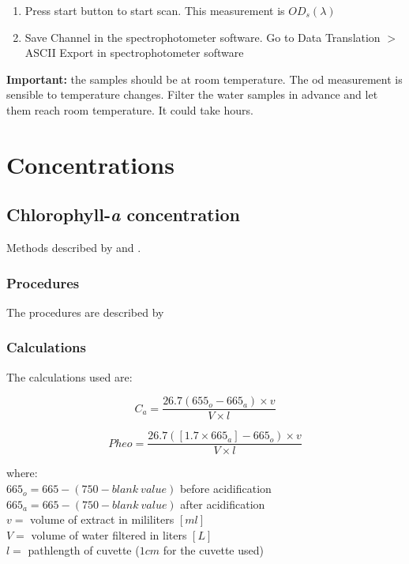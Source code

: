 \begin{appendices}
\begin{enumerate}[itemsep=2pt,parsep=2pt]
  \item Press start button to start scan. This measurement is $OD_s(\lambda)$
  \item Save Channel in the spectrophotometer software. Go to Data Translation $>$ ASCII Export in spectrophotometer software
\end{enumerate}
\textbf{Important:} the samples should be at room temperature. The \gls{od} measurement is sensible to temperature changes. Filter the water samples in advance and let them reach room temperature. It could take hours.

\section{Concentrations}
\subsection{Chlorophyll-{\it a} concentration}


Methods described by \cite{Lorenzen:1967fk} and \cite{Ritchie:2008eu}.
\subsubsection{Procedures}
The procedures are described by \cite{Tyler2013_chl_protocol}
\subsubsection{Calculations}

The calculations used \cite{Lorenzen:1967fk} are:

\begin{equation}
  C_a = \frac{26.7(655_o - 665_a)\times v}{V\times l}
\end{equation}

\begin{equation}
  Pheo = \frac{26.7([1.7\times 665_a]-665_o)\times v}{V\times l}
\end{equation}

\noindent where: \\
$665_o = 665 - (750-blank~value)$ before acidification\\
$665_a = 665 - (750-blank~value)$ after acidification  \\
$v = $ volume of extract in mililiters $[ml]$ \\
$V = $ volume of water filtered in liters $[L]$ \\
$l = $ pathlength of cuvette ($1cm$ for the cuvette used) \\


\end{appendices}
